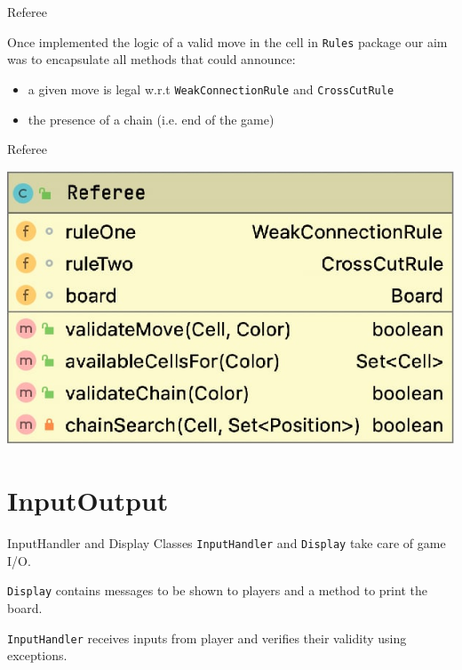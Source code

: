 \documentclass{beamer}
\begin{document}
\begin{frame}{Referee}
	
	Once implemented the logic of a valid move in the cell in \texttt{Rules} package our aim was to encapsulate all methods that could announce:
	\vspace{0.4cm}
	\begin{itemize}
		\item a given move is legal w.r.t \texttt{WeakConnectionRule} and \texttt{CrossCutRule}
		\vspace{0.35cm}
		\item the presence of a chain (i.e. end of the game)
	\end{itemize}
	
\end{frame}

\begin{frame}{Referee}
	\begin{center}
		\includegraphics[scale=0.32]{images/referee-class.jpg}
	\end{center}
\end{frame}


\section{InputOutput}

\begin{frame}{InputHandler and Display}
	Classes \texttt{InputHandler} and \texttt{Display} take care of game I/O.

	 \texttt{Display} contains messages to be shown to players and a method to print the board.
	
	 \texttt{InputHandler} receives inputs from player and verifies their validity using exceptions.  
\end{frame}
\end{document}
